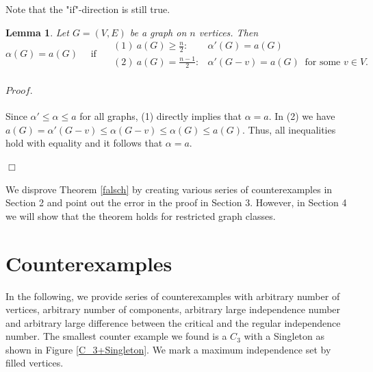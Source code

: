 \documentclass{scrartcl}
\newtheorem{theorem}[defsatzusw]{Theorem}
\newtheorem{lemma}[defsatzusw]{Lemma}
\newcommand{\N}{\mathbb N}
\newenvironment{proof}{\paragraph{$\mathit{Proof.}$}
	\vspace{-.4cm}\hspace{-.3cm}}{\vspace{-.2cm}\begin{flushright}$\Box$\end{flushright}}
\begin{document}
	\noindent
	Note that the "if"-direction is still true.
	
	\begin{lemma}\label{if}
		Let $G=(V,E)$ be a graph on $n$ vertices. Then $$\alpha(G)=a(G) \quad\text{ if }\quad	
		\begin{array}{ll}
			(1)~ a(G)\geq \frac n2:& \alpha'(G)=a(G)\\[2mm]
			(2)~ a(G)= \frac{n-1}{2}:& \alpha'(G-v)=a(G) ~\text{ for some } v\in V.
		\end{array}$$
	\end{lemma} 
	\begin{proof}
		Since $\alpha'\leq\alpha\leq a$ for all graphs, (1) directly implies that $\alpha=a$. 
		In (2) we have $a(G)=\alpha'(G-v)\leq\alpha(G-v)\leq\alpha(G)\leq a(G)$. 
		Thus, all inequalities hold with equality and it follows that $\alpha=a$.\vspace{-.45cm}
	\end{proof}

	
%	
%	
	
	\noindent
	We disprove Theorem \ref{falsch} by creating various series of counterexamples in Section 2 and point out the error in the proof in Section 3. However, in Section 4 we will show that the theorem holds for restricted graph classes. 
	

	
	\section{Counterexamples}
	In the following, we provide series of counterexamples with arbitrary number of vertices, arbitrary number of components, arbitrary large independence number and arbitrary large difference between the critical and the regular independence number. 
	The smallest counter example we found is a $C_3$ with a Singleton as shown in Figure \ref{C_3+Singleton}.
	We mark a maximum independence set by filled vertices.
	
\end{document}
